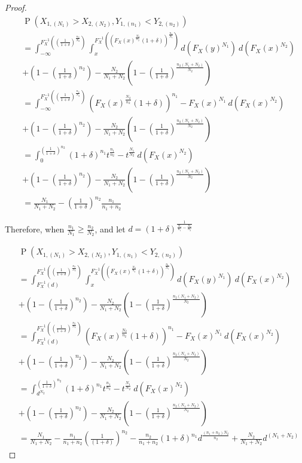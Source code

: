\documentclass[12pt]{article}
\DeclareMathOperator*{\Prob}{P}
\begin{document}
\begin{proof}
\begin{align*}
  &\Prob\left(X_{1,(N_1)} > X_{2,(N_2)}, Y_{1,(n_1)} < Y_{2,(n_2)}\right) \\
  &= \int_{-\infty}^{F_X^{-1}((\frac{1}{1+\delta})^\frac{n_2}{N_2})}\int_{x}^{F_X^{-1}((F_X(x)^\frac{N_2}{n_2}(1+\delta))^{\frac{n_1}{N_1}})} d(F_X(y)^{N_1}) \  d(F_X(x)^{N_2}) \\
  &+ (1 - (\frac	{1}{1+\delta})^{n_2}) - \frac{N_2}{N_1 + N_2}(1 - (\frac{1}{1+\delta})^{\frac{n_2(N_1+N_2)}{N_2}}) \\
  &= \int_{-\infty}^{F_X^{-1}((\frac{1}{1+\delta})^\frac{n_2}{N_2})}(F_X(x)^\frac{N_2}{n_2}(1+\delta))^{n_1} -  F_X(x)^{N_1}\  d(F_X(x)^{N_2}) \\
  &+ (1 - (\frac	{1}{1+\delta})^{n_2}) - \frac{N_2}{N_1 + N_2}(1 - (\frac{1}{1+\delta})^{\frac{n_2(N_1+N_2)}{N_2}}) \\
  &= \int_{0}^{(\frac{1}{1+\delta})^{n_2}}(1+\delta)^{n_1}t^{\frac{n_1}{n_2}} - t^{\frac{N_1}{N_2}}\  d(F_X(x)^{N_2}) \\
  &+ (1 - (\frac	{1}{1+\delta})^{n_2}) - \frac{N_2}{N_1 + N_2}(1 - (\frac{1}{1+\delta})^{\frac{n_2(N_1+N_2)}{N_2}}) \\
  &= \frac{N_1}{N_1 + N_2} - (\frac{1}{1+\delta})^{n_2}\frac{n_1}{n_1 + n_2}
  \end{align*}
  
Therefore, when $\frac{n_1}{N_1} \geq \frac{n_2}{N_2}$, and let $d = (1+\delta)^\frac{1}{\frac{N_1}{n_1} - \frac{N_2}{n_2}}$

\begin{align*}
  &\Prob\left(X_{1,(N_1)} > X_{2,(N_2)}, Y_{1,(n_1)} < Y_{2,(n_2)}\right) \\
  &= \int_{F_X^{-1}(d)}^{F_X^{-1}((\frac{1}{1+\delta})^\frac{n_2}{N_2})}\int_{x}^{F_X^{-1}((F_X(x)^\frac{N_2}{n_2}(1+\delta))^{\frac{n_1}{N_1}})} d(F_X(y)^{N_1}) \  d(F_X(x)^{N_2}) \\
  &+ (1 - (\frac	{1}{1+\delta})^{n_2}) - \frac{N_2}{N_1 + N_2}(1 - (\frac{1}{1+\delta})^{\frac{n_2(N_1+N_2)}{N_2}}) \\
  &= \int_{F_X^{-1}(d)}^{F_X^{-1}((\frac{1}{1+\delta})^\frac{n_2}{N_2})}(F_X(x)^\frac{N_2}{n_2}(1+\delta))^{n_1} -  F_X(x)^{N_1}\  d(F_X(x)^{N_2}) \\
  &+ (1 - (\frac	{1}{1+\delta})^{n_2}) - \frac{N_2}{N_1 + N_2}(1 - (\frac{1}{1+\delta})^{\frac{n_2(N_1+N_2)}{N_2}}) \\
  &= \int_{d^{N_2}}^{(\frac{1}{1+\delta})^{n_2}}(1+\delta)^{n_1}t^{\frac{n_1}{n_2}} - t^{\frac{N_1}{N_2}}\  d(F_X(x)^{N_2}) \\
  &+ (1 - (\frac	{1}{1+\delta})^{n_2}) - \frac{N_2}{N_1 + N_2}(1 - (\frac{1}{1+\delta})^{\frac{n_2(N_1+N_2)}{N_2}}) \\
  &= \frac{N_1}{N_1+N_2} - \frac{n_1}{n_1+n_2}(\frac{1}{(1+\delta)})^{n_2} - \frac{n_2}{n_1+n_2}(1+\delta)^{n_1}d^\frac{(n_1 + n_2)N_2}{n_2} + \frac{N_2}{N_1+N_2}d^{(N_1 + N_2)}
    \end{align*}
\end{proof}
\end{document}
